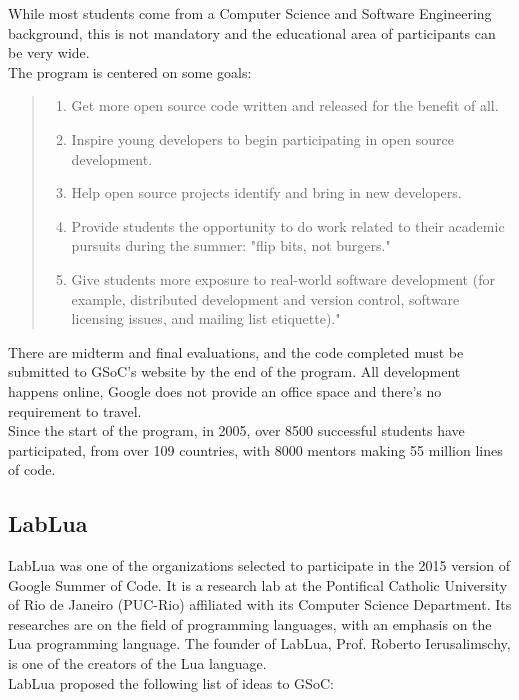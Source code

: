 \documentclass{article}
\begin{document}
While most students come from a Computer Science and Software Engineering background, this is not mandatory and the educational area of participants can be very wide.\\

The program is centered on some goals\autocite{gsocgoals}:
\begin{quote}\begin{enumerate}\item Get more open source code written and released for the benefit of all.
\item Inspire young developers to begin participating in open source development.
\item Help open source projects identify and bring in new developers.
\item Provide students the opportunity to do work related to their academic pursuits during the summer: "flip bits, not burgers."
\item Give students more exposure to real-world software development (for example, distributed development and version control, software licensing issues, and mailing list etiquette)."
	\end{enumerate}
\end{quote}

There are midterm and final evaluations, and the code completed must be submitted to GSoC's website by the end of the program. All development happens online, Google does not provide an office space and there's no requirement to travel.\\

Since the start of the program, in 2005, over 8500 successful students have participated, from over 109 countries, with 8000 mentors making 55 million lines of code.


\subsection{LabLua}
	
LabLua was one of the organizations selected to participate in the 2015 version of Google Summer of Code. It is a research lab at the Pontifical Catholic University of Rio de Janeiro (PUC-Rio) affiliated with its Computer Science Department. Its researches are on the field of programming languages, with an emphasis on the Lua programming language. The founder of LabLua, Prof. Roberto Ierusalimschy, is one of the creators of the Lua language.\\

LabLua proposed the following list of ideas to GSoC: 
\end{document}
